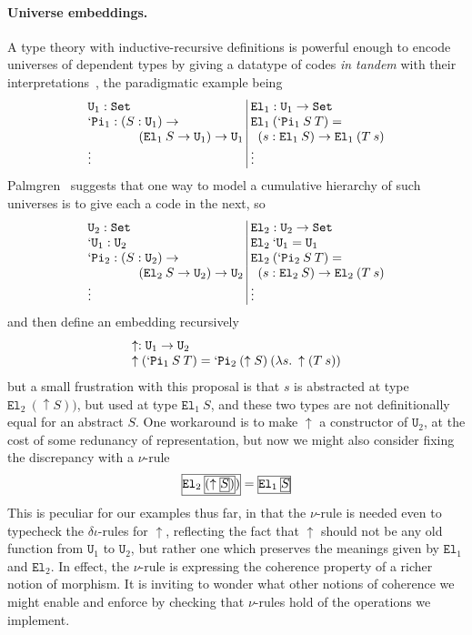 \paragraph{Universe embeddings.} A type theory with
inductive-recursive definitions is powerful enough to encode universes
of dependent types by giving a datatype of codes \emph{in tandem} with
their interpretations~\cite{DBLP:conf/tlca/DybjerS99}, the paradigmatic
example being
\[\begin{array}{@{}l@{\;}|@{\;}l@{}}
\mathtt{U}_1 : \mathtt{Set}
  & \mathtt{El}_1 : \mathtt{U}_1 \to \mathtt{Set} \\
\mathtt{`Pi}_1 : (S:\mathtt{U}_1)\to
  & \mathtt{El}_1\:(\mathtt{`Pi}_1\:S\:T) = \\
\qquad\qquad(\mathtt{El}_1\:S\to \mathtt{U}_1 )\to\mathtt{U}_1 &
\;\;(s : \mathtt{El}_1\:S)\to
  \mathtt{El}_1\:(T\:s) \\
\vdots & \vdots
\end{array}\]
Palmgren~\cite{Palmgren:universes} suggests that one way to model a
cumulative hierarchy of such universes is to give each a code in the
next, so
\[\begin{array}{@{}l@{\;}|@{\;}l@{}}
\mathtt{U}_2 : \mathtt{Set}
  & \mathtt{El}_2 : \mathtt{U}_2 \to \mathtt{Set} \\
\mathtt{`U}_1 : \mathtt{U}_2
  & \mathtt{El}_2\:\mathtt{`U}_1 = \mathtt{U}_1 \\
\mathtt{`Pi}_2 : (S:\mathtt{U}_2)\to
  & \mathtt{El}_2\:(\mathtt{`Pi}_2\:S\:T) = \\
\qquad\qquad(\mathtt{El}_2\:S\to \mathtt{U}_2 )\to\mathtt{U}_2 &
\;\;(s : \mathtt{El}_2\:S)\to
  \mathtt{El}_2\:(T\:s) \\
\vdots & \vdots
\end{array}\]
and then define an embedding recursively
\[\begin{array}{l}
\uparrow : \mathtt{U}_1 \to \mathtt{U}_2 \\
\uparrow(\mathtt{`Pi}_1\:S\:T) =
  \mathtt{`Pi}_2\:(\uparrow S)\:(\lambda s.\:\uparrow(T\:s))
\end{array}\]
but a small frustration with this proposal is that $s$ is abstracted at
type $\mathtt{El}_2\:(\uparrow S))$, but used at type
$\mathtt{El}_1\:S$, and these two types are not definitionally equal
for an abstract $S$. One workaround is to make $\uparrow$ a
constructor of $\mathtt{U}_2$, at the cost of some redunancy of
representation, but now we might also consider fixing the discrepancy
with a $\nu$-rule
\[
  \fbc{$\mathtt{El}_2\:\fbb{$(\uparrow \fba{$S$})$}) $} =
    \fbb{$\mathtt{El}_1\:\fba{$S$}$}
\]
This is peculiar for our examples thus far, in that the $\nu$-rule is
needed even to typecheck the $\delta\iota$-rules for $\uparrow$,
reflecting the fact that $\uparrow$ should not be any old function
from $\mathtt{U}_1$ to $\mathtt{U}_2$, but rather one which preserves
the meanings given by $\mathtt{El}_1$ and $\mathtt{El}_2$. In effect,
the $\nu$-rule is expressing the coherence property of a richer notion
of morphism. It is inviting to wonder what other notions of coherence
we might enable and enforce by checking that $\nu$-rules hold of the
operations we implement.

